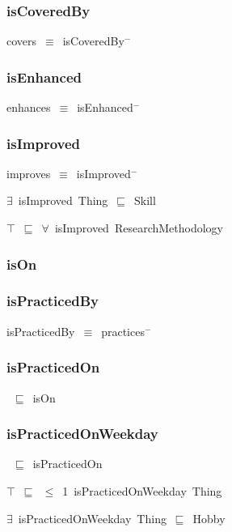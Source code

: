 \documentclass{article}
\begin{document}
\subsubsection*{isCoveredBy}

covers~\ensuremath{\equiv}~isCoveredBy\ensuremath{^-}

\subsubsection*{isEnhanced}

enhances~\ensuremath{\equiv}~isEnhanced\ensuremath{^-}

\subsubsection*{isImproved}

improves~\ensuremath{\equiv}~isImproved\ensuremath{^-}

\ensuremath{\exists}~isImproved~Thing~\ensuremath{\sqsubseteq}~Skill

\ensuremath{\top}~\ensuremath{\sqsubseteq}~\ensuremath{\forall}~isImproved~ResearchMethodology

\subsubsection*{isOn}

\subsubsection*{isPracticedBy}

isPracticedBy~\ensuremath{\equiv}~practices\ensuremath{^-}

\subsubsection*{isPracticedOn}

~\ensuremath{\sqsubseteq}~isOn

\subsubsection*{isPracticedOnWeekday}

~\ensuremath{\sqsubseteq}~isPracticedOn

\ensuremath{\top}~\ensuremath{\sqsubseteq}~\ensuremath{\leq}~1~isPracticedOnWeekday~Thing

\ensuremath{\exists}~isPracticedOnWeekday~Thing~\ensuremath{\sqsubseteq}~Hobby
\end{document}
